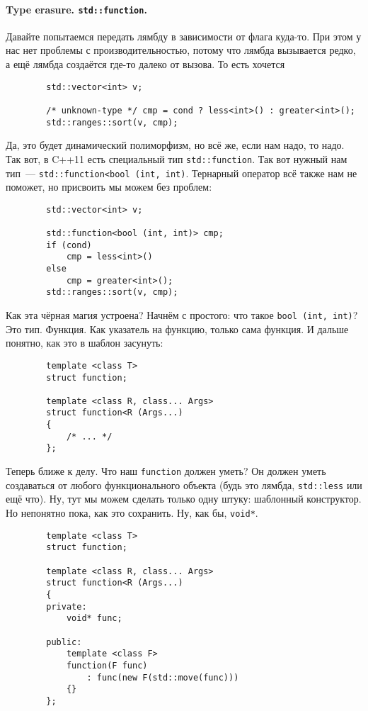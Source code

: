 \documentclass{article}
\begin{document}
    \paragraph{Type erasure. \texttt{std::function}.}
    Давайте попытаемся передать лямбду в зависимости от флага куда-то. При этом у нас нет проблемы с производительностью, потому что лямбда вызывается редко, а ещё лямбда создаётся где-то далеко от вызова. То есть хочется
    \begin{verbatim}
        std::vector<int> v;
        
        /* unknown-type */ cmp = cond ? less<int>() : greater<int>();
        std::ranges::sort(v, cmp);
    \end{verbatim}
    Да, это будет динамический полиморфизм, но всё же, если нам надо, то надо. Так вот, в C++11 есть специальный тип \texttt{std::function}. Так вот нужный нам тип~--- \texttt{std::function<bool (int, int)}. Тернарный оператор всё также нам не поможет, но присвоить мы можем без проблем:
    \begin{verbatim}
        std::vector<int> v;
        
        std::function<bool (int, int)> cmp;
        if (cond)
            cmp = less<int>()
        else
            cmp = greater<int>();
        std::ranges::sort(v, cmp);
    \end{verbatim}
    Как эта чёрная магия устроена? Начнём с простого: что такое \texttt{bool (int, int)}? Это тип. Функция. Как указатель на функцию, только сама функция. И дальше понятно, как это в шаблон засунуть:
    \begin{verbatim}
        template <class T>
        struct function;
        
        template <class R, class... Args>
        struct function<R (Args...)
        {
            /* ... */
        };
    \end{verbatim}
    Теперь ближе к делу. Что наш \texttt{function} должен уметь? Он должен уметь создаваться от любого функционального объекта (будь это лямбда, \texttt{std::less} или ещё что). Ну, тут мы можем сделать только одну штуку: шаблонный конструктор. Но непонятно пока, как это сохранить. Ну, как бы, \texttt{void*}.
    \begin{verbatim}
        template <class T>
        struct function;
        
        template <class R, class... Args>
        struct function<R (Args...)
        {
        private:
            void* func;

        public:
            template <class F>
            function(F func)
                : func(new F(std::move(func)))
            {}
        };
    \end{verbatim}
\end{document}

